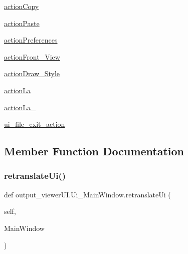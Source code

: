 \begin{DoxyCompactItemize}
\item 
\hyperlink{classoutput__viewer_u_i_1_1_ui___main_window_a591e47cae22ade3a6bd2a57754db9141}{action\+Copy}
\item 
\hyperlink{classoutput__viewer_u_i_1_1_ui___main_window_a0605f6f6261e3019d29e471b368398ed}{action\+Paste}
\item 
\hyperlink{classoutput__viewer_u_i_1_1_ui___main_window_a80387a6115341ac316c2582ffefd7ab1}{action\+Preferences}
\item 
\hyperlink{classoutput__viewer_u_i_1_1_ui___main_window_a808772e632be99f7d84eccedca596604}{action\+Front\+\_\+\+View}
\item 
\hyperlink{classoutput__viewer_u_i_1_1_ui___main_window_aa11ed317a9625aff4fd5a794dc570520}{action\+Draw\+\_\+\+Style}
\item 
\hyperlink{classoutput__viewer_u_i_1_1_ui___main_window_aa992117bc609f60f393c8fff5b5dc89f}{action\+La}
\item 
\hyperlink{classoutput__viewer_u_i_1_1_ui___main_window_a0e5b34f7aad679ffb90131f69372304a}{action\+La\+\_}
\item 
\hyperlink{classoutput__viewer_u_i_1_1_ui___main_window_a825bab69ddd68d04989a3f919debb14f}{ui\+\_\+file\+\_\+exit\+\_\+action}
\end{DoxyCompactItemize}


\subsection{Member Function Documentation}
\hypertarget{classoutput__viewer_u_i_1_1_ui___main_window_a96efd9219a406e801e268b7add32cb78}{}\label{classoutput__viewer_u_i_1_1_ui___main_window_a96efd9219a406e801e268b7add32cb78} 
\subsubsection{\texorpdfstring{retranslate\+Ui()}{retranslateUi()}}
{\footnotesize\ttfamily def output\+\_\+viewer\+U\+I.\+Ui\+\_\+\+Main\+Window.\+retranslate\+Ui (\begin{DoxyParamCaption}\item[{}]{self,  }\item[{}]{Main\+Window }\end{DoxyParamCaption})}

